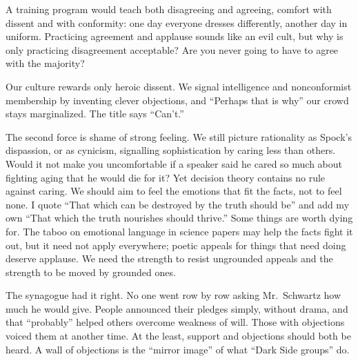 A training program would teach both disagreeing and agreeing, comfort with dissent and with conformity: one day everyone dresses differently, another day in uniform. Practicing agreement and applause sounds like an evil cult, but why is only practicing disagreement acceptable? Are you never going to have to agree with the majority? 

Our culture rewards only heroic dissent. We signal intelligence and nonconformist membership by inventing clever objections, and ``Perhaps that is why'' our crowd stays marginalized. The title says ``Can't.'' 

The second force is shame of strong feeling. We still picture rationality as Spock's dispassion, or as cynicism, signalling sophistication by caring less than others. Would it not make you uncomfortable if a speaker said he cared so much about fighting aging that he would die for it? Yet decision theory contains no rule against caring. We should aim to feel the emotions that fit the facts, not to feel none. I quote ``That which can be destroyed by the truth should be'' and add my own ``That which the truth nourishes should thrive.''  Some things are worth dying for. The taboo on emotional language in science papers may help the facts fight it out, but it need not apply everywhere; poetic appeals for things that need doing deserve applause. We need the strength to resist ungrounded appeals and the strength to be moved by grounded ones.

The synagogue had it right. No one went row by row asking Mr.~Schwartz how much he would give. People announced their pledges simply, without drama, and that ``probably'' helped others overcome weakness of will.  Those with objections voiced them at another time. At the least, support and objections should both be heard. A wall of objections is the ``mirror image'' of what ``Dark Side groups'' do.
